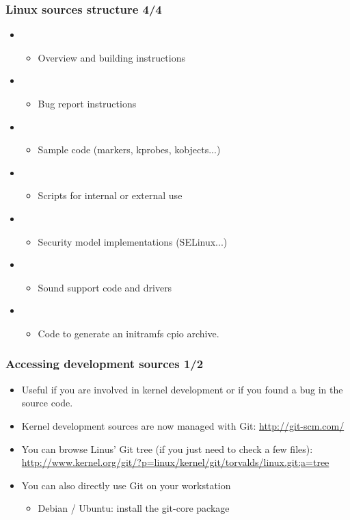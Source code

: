 \begin{frame}
  \frametitle{Linux sources structure 4/4}
  \begin{itemize}
  \item {}
    \begin{itemize}
    \item Overview and building instructions
    \end{itemize}
  \item {}
    \begin{itemize}
    \item Bug report instructions
    \end{itemize}
  \item {}
    \begin{itemize}
    \item Sample code (markers, kprobes, kobjects...)
    \end{itemize}
  \item {}
    \begin{itemize}
    \item Scripts for internal or external use
    \end{itemize}
  \item {}
    \begin{itemize}
    \item Security model implementations (SELinux...)
    \end{itemize}
  \item {}
    \begin{itemize}
    \item Sound support code and drivers
    \end{itemize}
  \item {}
    \begin{itemize}
    \item Code to generate an initramfs cpio archive.
    \end{itemize}
  \end{itemize}
\end{frame}

\begin{frame}
  \frametitle{Accessing development sources 1/2}
  \begin{itemize}
  \item Useful if you are involved in kernel development or if you
    found a bug in the source code.
  \item Kernel development sources are now managed with Git:
    \url{http://git-scm.com/}
  \item You can browse Linus' Git tree (if you just need to check a
    few files):
    \url{http://www.kernel.org/git/?p=linux/kernel/git/torvalds/linux.git;a=tree}
  \item You can also directly use Git on your workstation
    \begin{itemize}
    \item Debian / Ubuntu: install the git-core package
    \end{itemize}
  \end{itemize}
\end{frame}

